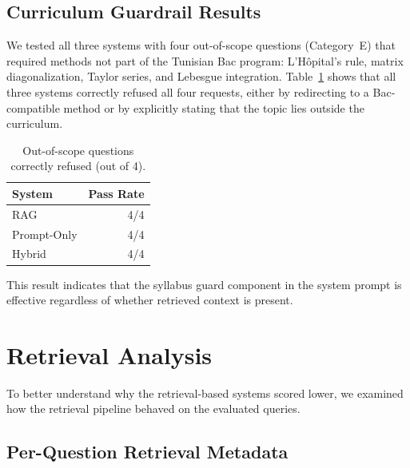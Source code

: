 \subsection{Curriculum Guardrail Results}
We tested all three systems with four out-of-scope questions (Category~E)
that required methods not part of the Tunisian Bac program: L'H\^opital's
rule, matrix diagonalization, Taylor series, and Lebesgue integration.
Table~\ref{tab:guardrail-results} shows that all three systems correctly
refused all four requests, either by redirecting to a Bac-compatible method
or by explicitly stating that the topic lies outside the curriculum.
\begin{table}[H]
\centering
\caption{Out-of-scope questions correctly refused (out of 4).}
\label{tab:guardrail-results}
\begin{tabular}{lr}
\toprule
\textbf{System} & \textbf{Pass Rate} \\
\midrule
RAG         & 4/4 \\
Prompt-Only & 4/4 \\
Hybrid      & 4/4 \\
\bottomrule
\end{tabular}
\end{table}
This result indicates that the syllabus guard component in the system
prompt is effective regardless of whether retrieved context is present.
\section{Retrieval Analysis}
\label{sec:per-question-breakdown}

To better understand why the retrieval-based systems scored lower, we
examined how the retrieval pipeline behaved on the evaluated queries.

\subsection{Per-Question Retrieval Metadata}

